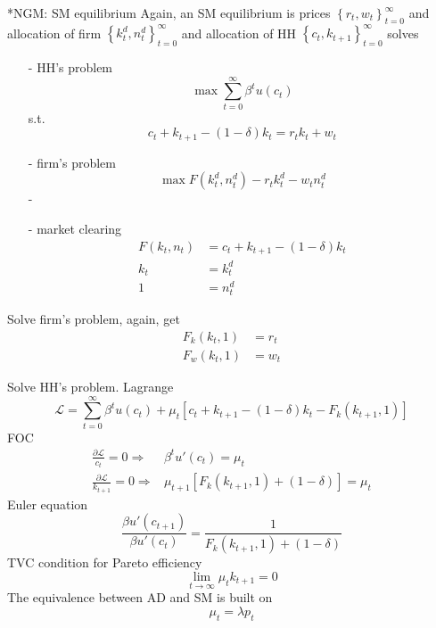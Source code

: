 \documentclass[10pt,landscape,a4paper]{article}
\makeatletter
\renewcommand{\subsection}{\@startsection{subsection}{1}{0mm}{.2ex}{.2ex}{\small\bfseries}}
\makeatother
\begin{document}
\begin{multicols*}{3}
\subsection*{NGM: SM equilibrium}
Again, an SM equilibrium is prices $\left\{r_t,w_t\right\}_{t=0}^{\infty}$ and allocation of firm $\left\{k^d_t,n^d_t\right\}_{t=0}^{\infty}$ and allocation of HH $\left\{c_t,k_{t+1}\right\}_{t=0}^{\infty}$ solves
\begin{itemize}
    \item[-] HH's problem
    $$
    \max\sum_{t=0}^{\infty}\beta^t u(c_t)
    $$
    s.t.
    $$
    c_t+k_{t+1}-(1-\delta)k_t = r_tk_t+w_t
    $$
    \item[-] firm's problem
    $$
    \max F(k^d_t,n^d_t) -r_tk^d_t - w_tn^d_t
    $$
    -\item[-] market clearing
\begin{align*}
    F(k_t,n_t) &= c_t+k_{t+1}-(1-\delta)k_t\\
    k_t &= k^d_t\\
    1 &=n^d_t
\end{align*}
\end{itemize}

Solve firm's problem, again, get
\begin{align*}
    F_k(k_t,1)&=r_t\\
    F_w(k_t,1)&=w_t
\end{align*}

Solve HH's problem. Lagrange
$$
\mathcal{L}=\sum^{\infty}_{t=0}\beta^tu(c_t)+ \mu_t\left[ c_t+k_{t+1}-(1-\delta)k_t-F_k(k_{t+1},1)  \right]
$$
FOC
\begin{align*}
    \frac{\partial{\mathcal{L}}}{c_t}=0\Rightarrow & \beta^t u'(c_t) = \mu_t\\
    \frac{\partial{\mathcal{L}}}{k_{t+1}}=0\Rightarrow & \mu_{t+1}\left[F_k(k_{t+1},1)+(1-\delta)\right] = \mu_t 
\end{align*}
Euler equation
$$
\frac{\beta u'(c_{t+1})}{\beta u'(c_t)}=\frac{1}{F_k(k_{t+1},1)+(1-\delta)}
$$
TVC condition for Pareto efficiency
$$
\lim_{t\rightarrow\infty}\mu_t k_{t+1}=0
$$
The equivalence between AD and SM is built on
$$
\mu_t = \lambda p_t
$$

\vspace{2pt}


\end{multicols*}
\end{document}
